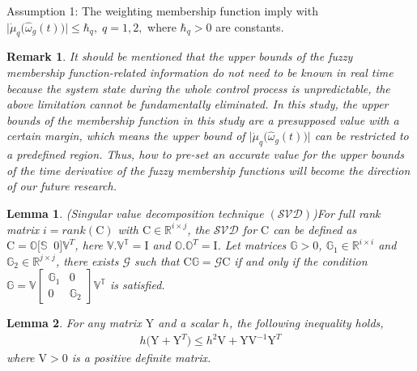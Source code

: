 \documentclass[preprint,11pt]{elsarticle}
\newtheorem{lemma}{Lemma}
\newtheorem{remark}{Remark}
\begin{document}
{Assumption 1:}\cite{obs1} The weighting membership function imply with
$
\big|{\dot{\mu}_q\big( \hat{\omega}_g(t) \big)\big|}\leq \hbar_q,\;q=1,2,
$
where $\hbar_q>0$ are constants.
\begin{remark}
{It should be mentioned that the upper bounds of the fuzzy membership function-related information do not need to be known in real time because the system state during the whole control process is unpredictable, the above limitation cannot be fundamentally eliminated. In this study, the upper bounds of the membership function in this study are a presupposed value with a certain margin, which means the upper bound of $\big|{\dot{\mu}_q\big( \hat{\omega}_g(t) \big)\big|}$ can be restricted to a predefined region. Thus, how to pre-set an accurate value for the upper bounds of the time derivative of the fuzzy membership functions will become the direction of our future research.}
\end{remark}
\vspace{-0.5cm}
\begin{lemma} \cite{lem2} (Singular value decomposition technique $(\mathcal{SVD})$)\label{lem2}
For full rank matrix $i=rank(\mathrm{C})$ with $\mathrm{C}\in \mathbb{R}^{i\times j}$, the $\mathcal{SVD}$ for $\mathrm{C}$ can be defined as $\mathrm{C}=\mathbb{O}\big[ \mathbb{S}\;\;0 \big]\mathbb{V}^T$, here $\mathbb{V.V^T}=\mathrm{I}$ and $\mathbb{O.O}^T=\mathrm{I}$. Let matrices $\mathbb{G}>0$, $\mathbb{G}_1\in \mathbb{R}^{i\times i}$ and $\mathbb{G}_2\in  \mathbb{R}^{j\times j}$, there exists $\mathcal{G}$ such that $\mathrm{C}\mathbb{G}=\mathcal{G}\mathrm{C}$ if and only if the condition
$\mathbb{G}=\mathbb{V}\begin{bmatrix}
\mathbb{G}_1& 0\\
0&\mathbb{G}_2
\end{bmatrix}\mathbb{V^T}$ is satisfied.
\end{lemma}
\begin{lemma}\cite{lem1}\label{lem1}
For any matrix $\mathrm{Y}$ and a scalar $h$, the following inequality holds,
\begin{eqnarray*}
h\big(\mathrm{Y}+\mathrm{Y}^T  \big)\leq h^2 \mathrm{V}+ \mathrm{Y}\mathrm{V}^{-1} \mathrm{Y}^T
\end{eqnarray*}
where $\mathrm{V}>0$ is a positive definite matrix.
\end{lemma}
\vspace{-0.5cm}
\end{document}
